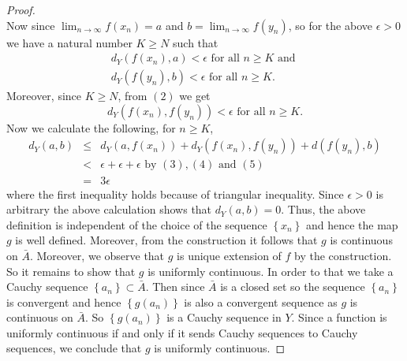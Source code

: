 \documentclass{article}
\begin{document}
\begin{proof}
$$$$
Now since $\lim _{n \rightarrow \infty} f\left(x_n\right)=a$ and $b=\lim _{n \rightarrow \infty} f\left(y_n\right)$, so for the above $\epsilon>0$ we have a natural number $K \geq N$ such that
$$
\begin{gathered}
d_Y\left(f\left(x_n\right), a\right)<\epsilon \text { for all } n \geq K \text { and } \\
d_Y\left(f\left(y_n\right), b\right)<\epsilon \text { for all } n \geq K .
\end{gathered}
$$
Moreover, since $K \geq N$, from $(2)$ we get
$$
d_Y\left(f\left(x_n\right), f\left(y_n\right)\right)<\epsilon \text { for all } n \geq K .
$$
Now we calculate the following, for $n \geq K$,
$$
\begin{array}{rlr}
d_Y(a, b) & \leq & d_Y\left(a, f\left(x_n\right)\right)+d_Y\left(f\left(x_n\right), f\left(y_n\right)\right)+d\left(f\left(y_n\right), b\right) \\
& < & \epsilon+\epsilon+\epsilon \text { by }(3),(4) \text { and }(5) \\
& = & 3 \epsilon
\end{array}
$$
where the first inequality holds because of triangular inequality. Since $\epsilon>0$ is arbitrary the above calculation shows that $d_Y(a, b)=0$. Thus, the above definition is independent of the choice of the sequence $\left\{x_n\right\}$ and hence the map $g$ is well defined. Moreover, from the construction it follows that $g$ is continuous on $\bar{A}$.
Moreover, we observe that $g$ is unique extension of $f$ by the construction.
So it remains to show that $g$ is uniformly continuous. In order to that we take a Cauchy sequence $\left\{a_n\right\} \subset \bar{A}$. Then since $\bar{A}$ is a closed set so the sequence $\left\{a_n\right\}$ is convergent and hence $\left\{g\left(a_n\right)\right\}$ is also a convergent sequence as $g$ is continuous on $\bar{A}$. So $\left\{g\left(a_n\right)\right\}$ is a Cauchy sequence in $Y$. Since a function is uniformly continuous if and only if it sends Cauchy sequences to Cauchy sequences, we conclude that $g$ is uniformly continuous.
\end{proof}
\end{document}
